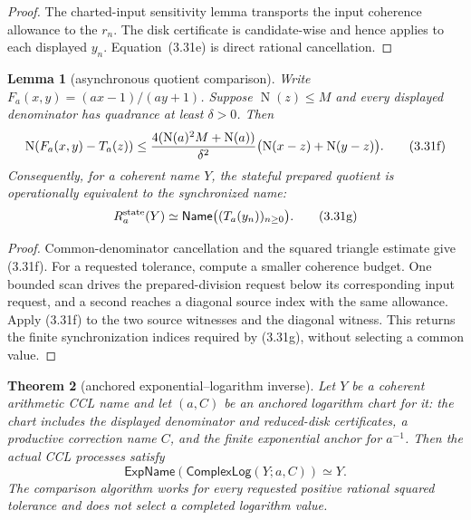 \documentclass[10pt]{article}
\newtheorem{theorem}{Theorem}[section]
\newtheorem{lemma}[theorem]{Lemma}
\theoremstyle{definition}
\theoremstyle{remark}
\newcommand{\Norm}{\operatorname{N}}
\begin{document}
\begin{proof}
The charted-input sensitivity lemma transports the input coherence allowance
to the $r_n$.  The disk certificate is candidate-wise and hence applies to
each displayed $y_n$.  Equation~(3.31e) is direct rational cancellation.
\end{proof}

\begin{lemma}[asynchronous quotient comparison]
Write $F_a(x,y)=(ax-1)/(ay+1)$.  Suppose $\Norm(z)\le M$ and every displayed
denominator has quadrance at least $\delta>0$.  Then
\[
 \Norm(F_a(x,y)-T_a(z))
 \le {4(\Norm(a)^2M+\Norm(a))\over\delta^2}
       \bigl(\Norm(x-z)+\Norm(y-z)\bigr).
\tag{3.31f}
\]
Consequently, for a coherent name $Y$, the stateful prepared quotient is
operationally equivalent to the synchronized name:
\[
 R_a^{\rm state}(Y)
 \simeq \mathsf{Name}\bigl((T_a(y_n))_{n\ge0}\bigr).
\tag{3.31g}
\]
\end{lemma}

\begin{proof}
Common-denominator cancellation and the squared triangle estimate give
(3.31f).  For a requested tolerance, compute a smaller coherence budget.
One bounded scan drives the prepared-division request below its corresponding
input request, and a second reaches a diagonal source index with the same
allowance.  Apply (3.31f) to the two source witnesses and the diagonal
witness.  This returns the finite synchronization indices required by
(3.31g), without selecting a common value.
\end{proof}

\begin{theorem}[anchored exponential--logarithm inverse]
\label{thm:anchored-exp-log-inverse}
Let $Y$ be a coherent arithmetic CCL name and let $(a,C)$ be an anchored
logarithm chart for it: the chart includes the displayed denominator and
reduced-disk certificates, a productive correction name $C$, and the finite
exponential anchor for $a^{-1}$.  Then the actual CCL processes satisfy
\[
 \mathsf{ExpName}(\mathsf{ComplexLog}(Y;a,C))\simeq Y.
\]
The comparison algorithm works for every requested positive rational squared
tolerance and does not select a completed logarithm value.
\end{theorem}
\end{document}
